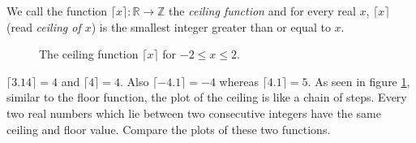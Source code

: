 \documentclass[12pt]{subfile}
\begin{document}
        \begin{definition}
        	We call the function $\lceil x \rceil: \mathbb{R} \to \mathbb Z$ the \textit{ceiling function} and for every real $x$, $\lceil x\rceil$ (read \textit{ceiling of $x$}) is the smallest integer greater than or equal to $x$.

    		\begin{figure}
    			\centering
    			\caption{The ceiling function $\lceil x \rceil$ for $-2 \leq x \leq 2$.}
    			\label{fig:ceilingfunction}
    		\end{figure}
    	\end{definition}

    	\begin{example}
    		$\lceil3.14\rceil=4$ and $\lceil4\rceil=4$. Also $\lceil-4.1\rceil=-4$ whereas $\lceil4.1\rceil=5$. As seen in figure \ref{fig:ceilingfunction}, similar to the floor function, the plot of the ceiling is like a chain of steps. Every two real numbers which lie between two consecutive integers have the same ceiling and floor value. Compare the plots of these two functions.
    	\end{example}
\end{document}
